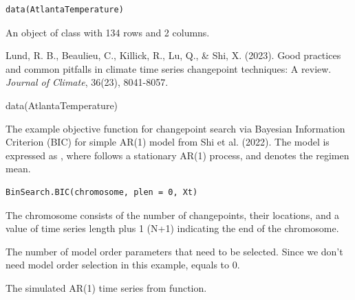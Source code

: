 \documentclass[a4paper]{book}
\begin{document}
%
\begin{Usage}
\begin{verbatim}
data(AtlantaTemperature)
\end{verbatim}
\end{Usage}
%
\begin{Format}
An object of class  with 134 rows and 2 columns.
\end{Format}
%
\begin{References}
Lund, R. B., Beaulieu, C., Killick, R., Lu, Q., \& Shi, X. (2023).
Good practices and common pitfalls in climate time series changepoint techniques:
A review. \emph{Journal of Climate}, 36(23), 8041-8057.
\end{References}
%
\begin{Examples}
\begin{ExampleCode}
data(AtlantaTemperature)
\end{ExampleCode}
\end{Examples}
%
\begin{Description}
The example objective function for changepoint search via Bayesian
Information Criterion (BIC) for simple AR(1) model from Shi et al. (2022).
The model is expressed as , where
 follows a stationary AR(1) process, and 
denotes the regimen mean.
\end{Description}
%
\begin{Usage}
\begin{verbatim}
BinSearch.BIC(chromosome, plen = 0, Xt)
\end{verbatim}
\end{Usage}
%
\begin{Arguments}
\begin{ldescription}
\item[\code{chromosome}] The chromosome consists of the number of changepoints, their
locations, and a value of time series length plus 1 (N+1) indicating the end
of the chromosome.

\item[\code{plen}] The number of model order parameters that need to be selected.
Since we don't need model order selection in this example,  equals
to 0.

\item[\code{Xt}] The simulated AR(1) time series from  function.
\end{ldescription}
\end{Arguments}
\end{document}
